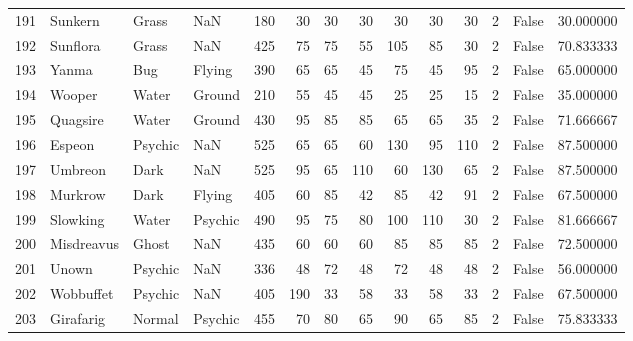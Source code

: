 \begin{tabular}{rlllrrrrrrrrlr}
 191 &                    Sunkern &     Grass &       NaN &    180 &   30 &      30 &       30 &       30 &       30 &     30 &           2 &      False &   30.000000 \\
 192 &                   Sunflora &     Grass &       NaN &    425 &   75 &      75 &       55 &      105 &       85 &     30 &           2 &      False &   70.833333 \\
 193 &                      Yanma &       Bug &    Flying &    390 &   65 &      65 &       45 &       75 &       45 &     95 &           2 &      False &   65.000000 \\
 194 &                     Wooper &     Water &    Ground &    210 &   55 &      45 &       45 &       25 &       25 &     15 &           2 &      False &   35.000000 \\
 195 &                   Quagsire &     Water &    Ground &    430 &   95 &      85 &       85 &       65 &       65 &     35 &           2 &      False &   71.666667 \\
 196 &                     Espeon &   Psychic &       NaN &    525 &   65 &      65 &       60 &      130 &       95 &    110 &           2 &      False &   87.500000 \\
 197 &                    Umbreon &      Dark &       NaN &    525 &   95 &      65 &      110 &       60 &      130 &     65 &           2 &      False &   87.500000 \\
 198 &                    Murkrow &      Dark &    Flying &    405 &   60 &      85 &       42 &       85 &       42 &     91 &           2 &      False &   67.500000 \\
 199 &                   Slowking &     Water &   Psychic &    490 &   95 &      75 &       80 &      100 &      110 &     30 &           2 &      False &   81.666667 \\
 200 &                 Misdreavus &     Ghost &       NaN &    435 &   60 &      60 &       60 &       85 &       85 &     85 &           2 &      False &   72.500000 \\
 201 &                      Unown &   Psychic &       NaN &    336 &   48 &      72 &       48 &       72 &       48 &     48 &           2 &      False &   56.000000 \\
 202 &                  Wobbuffet &   Psychic &       NaN &    405 &  190 &      33 &       58 &       33 &       58 &     33 &           2 &      False &   67.500000 \\
 203 &                  Girafarig &    Normal &   Psychic &    455 &   70 &      80 &       65 &       90 &       65 &     85 &           2 &      False &   75.833333 \\

\end{tabular}
